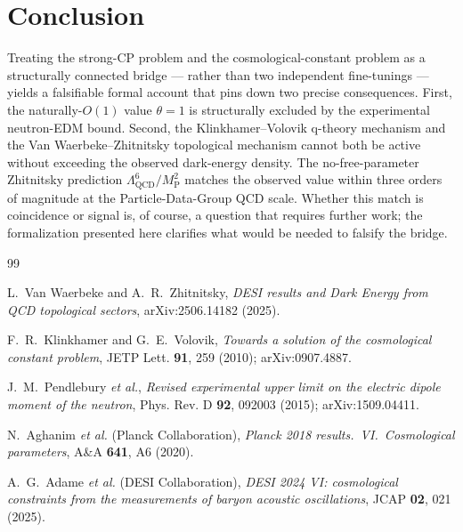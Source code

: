 \documentclass[twocolumn]{revtex4-2}
\newcommand{\Lqcd}{\Lambda_{\mathrm{QCD}}}
\newcommand{\MP}{M_{\mathrm{P}}}
\begin{document}
\section{Conclusion}
\label{sec:conclusion}

Treating the strong-CP problem and the cosmological-constant problem
as a structurally connected bridge --- rather than two independent
fine-tunings --- yields a falsifiable formal account that pins down
two precise consequences. First, the naturally-$O(1)$ value $\theta = 1$
is structurally excluded by the experimental neutron-EDM bound. Second,
the Klinkhamer--Volovik q-theory mechanism and the Van
Waerbeke--Zhitnitsky topological mechanism cannot both be active
without exceeding the observed dark-energy density. The
no-free-parameter Zhitnitsky prediction $\Lqcd^6/\MP^2$ matches the
observed value within three orders of magnitude at the
Particle-Data-Group QCD scale. Whether this match is coincidence or
signal is, of course, a question that requires further work; the
formalization presented here clarifies what would be needed to falsify
the bridge.

\begin{thebibliography}{99}

L.~Van Waerbeke and A.~R.~Zhitnitsky,
\emph{DESI results and Dark Energy from QCD topological sectors},
arXiv:2506.14182 (2025).

F.~R.~Klinkhamer and G.~E.~Volovik,
\emph{Towards a solution of the cosmological constant problem},
JETP Lett. \textbf{91}, 259 (2010); arXiv:0907.4887.

J.~M.~Pendlebury \textit{et al.},
\emph{Revised experimental upper limit on the electric dipole moment
of the neutron}, Phys. Rev. D \textbf{92}, 092003 (2015);
arXiv:1509.04411.

N.~Aghanim \textit{et al.\/} (Planck Collaboration),
\emph{Planck 2018 results.\ VI.\ Cosmological parameters},
A\&A \textbf{641}, A6 (2020).

A.~G.~Adame \textit{et al.\/} (DESI Collaboration),
\emph{DESI 2024 VI: cosmological constraints from the measurements
of baryon acoustic oscillations}, JCAP \textbf{02}, 021 (2025).

\end{thebibliography}
\end{document}
